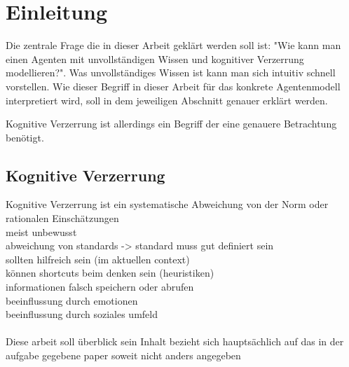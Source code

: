 \chapter{Einleitung}
\label{introduction}
Die zentrale Frage die in dieser Arbeit geklärt werden soll ist: "Wie kann man einen Agenten mit unvollständigen Wissen und kognitiver Verzerrung modellieren?". 
Was unvollständiges Wissen ist kann man sich intuitiv schnell vorstellen. Wie dieser Begriff in dieser Arbeit für das konkrete Agentenmodell interpretiert wird, soll in dem jeweiligen Abschnitt genauer erklärt werden.

Kognitive Verzerrung ist allerdings ein Begriff der eine genauere Betrachtung benötigt.

\section{Kognitive Verzerrung}
Kognitive Verzerrung ist ein systematische Abweichung von der Norm oder rationalen Einschätzungen\\
meist unbewusst\\
abweichung von standards -> standard muss gut definiert sein\\
sollten hilfreich sein (im aktuellen context)\\
können shortcuts beim denken sein (heuristiken)\\
informationen falsch speichern oder abrufen\\
beeinflussung durch emotionen\\
beeinflussung durch soziales umfeld\\
\\
Diese arbeit soll überblick sein 
Inhalt bezieht sich hauptsächlich auf das in der aufgabe gegebene paper soweit nicht anders angegeben\\
